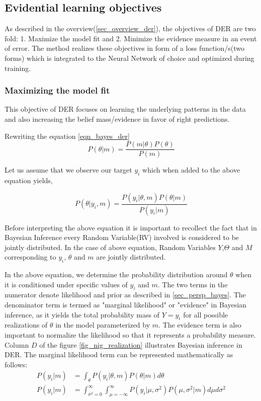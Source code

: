 	\subsection{Evidential learning objectives}\label{sec_evi_learning_objectives}
	As described in the overview(\ref{sec_overview_der}), the objectives of DER are two fold: 1. Maximize the model fit and 2. Minimize the evidence measure in an event of error. The method realizes these objectives in form of a loss function/s(two forms) which is integrated to the Neural Network of choice and optimized during training. 
	
	\subsubsection{Maximizing the model fit}
	This objective of DER focuses on learning the underlying patterns in the data and also increasing the belief mass/evidence in favor of right predictions.
	
	Rewriting the equation \ref{eqn_bayes_der}
	\begin{equation*}
		P(\theta|m) = \frac{P(m|\theta)P(\theta)}{P(m)}
	\end{equation*}
	
	Let us assume that we observe our target $y_i$ which when added to the above equation yields,
	
	\begin{equation}
		P(\theta|y_i,m) = \frac{P(y_i|\theta,m)P(\theta|m)}{P(y_i|m)}
	\end{equation}
	
	Before interpreting the above equation it is important to recollect the fact that in Bayesian Inference every Random Variable(RV) involved is considered to be jointly distributed. In the case of above equation, Random Variables $Y$,$\Theta$ and $M$ corresponding to $y_i$, $\theta$ and $m$ are jointly distributed.
	
	In the above equation, we determine the probability distribution around $\theta$ when it is conditioned under specific values of  $y_i$ and $m$. The two terms in the numerator denote likelihood and prior as described in \ref{sec_persp_bayes}. The denominator term is termed as "marginal likelihood" or "evidence" in Bayesian inference, as it yields the total probability mass  of $Y=y_i$ for all possible realizations of $\theta$ in the model parameterized by $m$. The evidence term is also important to normalize the likelihood so that it represents a probability measure. Column $D$ of the figure \ref{fig_nig_realization} illustrates Bayesian inference in DER.
	The marginal likelihood term can be represented mathematically as follows:
	\begin{align}
		P(y_i|m) &= \int_{\theta}P(y_i|\theta,m)P(\theta|m)d\theta	\\
		P(y_i|m) &=\int_{\sigma^2=0}^{\infty}\int_{\mu=-\infty}^{\infty}P(y_i|\mu,\sigma^2)P(\mu,\sigma^2|m)d\mu d\sigma^2
	\end{align}
	
